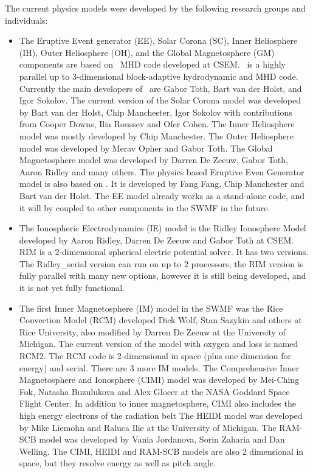 The current physics models were developed by the following research groups
and individuals:
\begin{itemize}
\item
The Eruptive Event generator (EE), Solar Corona (SC), Inner Heliosphere (IH), 
Outer Heliosphere (OH), and the Global Magnetosphere (GM) 
components are based on \BATSRUS\ MHD code developed at CSEM. 
\BATSRUS\ is a highly parallel up to 3-dimensional block-adaptive 
hydrodynamic and MHD code. 
Currently the main developers of \BATSRUS\ are Gabor Toth,
Bart van der Holst, and Igor Sokolov.
The current version of the Solar Corona model was developed
by Bart van der Holst, Chip Manchester, Igor Sokolov with contributions
from Cooper Downs, Ilia Roussev and Ofer Cohen. 
The Inner Heliosphere model was mostly developed by Chip Manchester.
The Outer Heliosphere model was developed by Merav Opher and Gabor Toth. 
The Global Magnetosphere model was developed by 
Darren De Zeeuw, Gabor Toth, Aaron Ridley and many others.
The physics based Eruptive Even Generator model is also based on
\BATSRUS. It is developed by Fang Fang, Chip Manchester and Bart van
der Holst. The EE model already works as a stand-alone code, and
it will by coupled to other components in the SWMF in the future.

\item
The Ionospheric Electrodynamics (IE) model is the Ridley Ionosphere Model
developed by Aaron Ridley, Darren De Zeeuw and Gabor Toth at CSEM.
RIM  is a 2-dimensional spherical electric potential solver.
It has two versions. The Ridley\_serial version can run on up to 2 processors,
the RIM version is fully parallel with many new options, however it is still
being developed, and it is not yet fully functional.

\item
The first Inner Magnetosphere (IM) model in the SWMF was
the Rice Convection Model (RCM) developed Dick Wolf, Stan Sazykin and 
others at Rice University, also modified by Darren De Zeeuw at the
University of Michigan. The current version of the model with oxygen and loss
is named RCM2. The RCM code is 2-dimensional in space 
(plus one dimension for energy) and serial. There are 3 more IM models.
The Comprehensive Inner Magnetosphere and Ionosphere (CIMI) model 
was developed by Mei-Ching Fok, Natasha Buzulukova and 
Alex Glocer at the NASA Goddard Space Flight Center.
In addition to inner magnetosphere, CIMI also includes the high
energy electrons of the radiation belt
The HEIDI model was developed by Mike Liemohn and Raluca Ilie 
at the University of Michigan.
The RAM-SCB model was developed by Vania Jordanova, Sorin Zaharia and
Dan Welling. The CIMI, HEIDI and RAM-SCB models are also 2 dimensional
in space, but they resolve energy as well as pitch angle.


\end{itemize}
